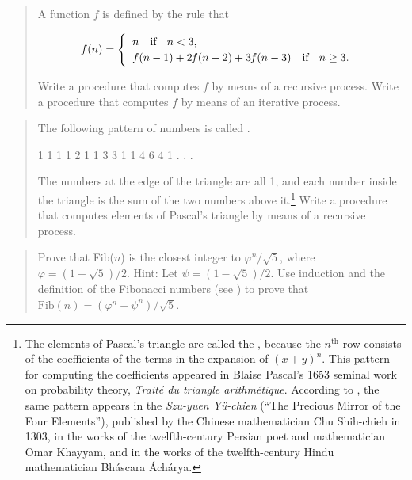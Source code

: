 \begin{quote}
 A function \( f \) is defined by
the rule that

$$
f(n) =
\begin{cases}
\;\; n \quad \text{if \; \( n < 3 \),} \\
\;\; f(n-1) + 2\kern-0.08em f(n-2) + 3\kern-0.08em f(n-3) \quad \text{if \; \( n \ge 3 \).}
\end{cases}
$$

Write a procedure that computes \( f \) by means of a recursive process.  Write a procedure that
computes \( f \) by means of an iterative process.
\end{quote}

\begin{quote}
 The following pattern of numbers
is called .

\begin{example}
        1
      1   1
    1   2   1
  1   3   3   1
1   4   6   4   1
      . . .
\end{example}

The numbers at the edge of the triangle are all 1, and each number inside the
triangle is the sum of the two numbers above it.\footnote{The elements of
Pascal's triangle are called the , because the
\( n^{\mathrm{th}} \) row consists of the coefficients of the terms in the expansion of
\( (x + y)^n \).  This pattern for computing the coefficients appeared in
Blaise Pascal's 1653 seminal work on probability theory, \textit{Trait\'e du
triangle arithm\'etique}.  According to , the same pattern appears
in the \textit{Szu-yuen Y\"u-chien} (``The Precious Mirror of the Four
Elements''), published by the Chinese mathematician Chu Shih-chieh in 1303, in
the works of the twelfth-century Persian poet and mathematician Omar Khayyam,
and in the works of the twelfth-century Hindu mathematician Bh\'ascara
\'Ach\'arya.} Write a procedure that computes elements of Pascal's triangle by
means of a recursive process.
\end{quote}

\begin{quote}
 Prove that Fib(\( n \)) is
the closest integer to \( \varphi^n / \sqrt{5} \), where \( \varphi = (1 +
\sqrt{5}) / 2 \).  Hint: Let \( \psi = (1 - \sqrt{5}) / 2 \).
Use induction and the definition of the Fibonacci numbers (see )
to prove that \( \text{Fib}(n) = (\varphi^n - \psi^n) / \sqrt{5} \).
\end{quote}

